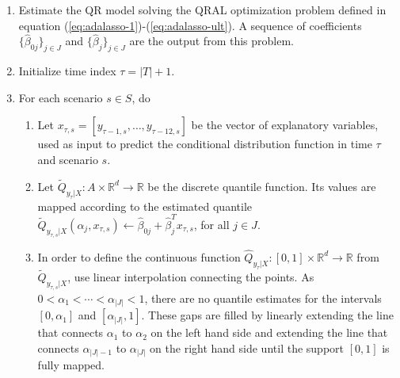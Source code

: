 \begin{enumerate}
	
	\item Estimate the QR model solving the QRAL optimization problem defined in equation (\ref{eq:adalasso-1})-(\ref{eq:adalasso-ult}). 
	A sequence of coefficients $\{ \hat\beta_{0j} \}_{j \in J}$ and $\{ \hat\beta_{j} \}_{j \in J}$ are the output from this problem. 

	\item Initialize time index $\tau = |T| + 1$.
	
	\item For each scenario $s \in S$, do
		\begin{enumerate}

		\item Let $x_{\tau,s} = [y_{\tau-1,s}, \dots, y_{\tau-12,s}]$ be the vector of explanatory variables, used as input to predict the conditional distribution function in time $\tau$ and scenario $s$.

		\item Let $\tilde{Q}_{y_\tau|X}:A \times \mathbb{R}^d \rightarrow \mathbb{R}$ be the discrete quantile function. Its values are mapped according to the estimated quantile $\tilde Q_{y_{\tau,s}|X}(\alpha_j, x_{\tau,s}) \leftarrow \hat\beta_{0j} + \hat\beta_j^T x_{\tau,s}$, for all $j \in J$.
		


		\item In order to define the continuous function $\hat{Q}_{y_\tau|X}:[0,1] \times \mathbb{R}^d \rightarrow \mathbb{R}$ from $\tilde Q_{y_{\tau,s}|X}$, use linear interpolation connecting the points. As $0 < \alpha_1 < \cdots < \alpha_{|J|} < 1$, there are no quantile estimates for the intervals $[0,\alpha_1]$ and $[\alpha_{|J|},1]$. These gaps are filled by linearly extending the line that connects $\alpha_1$ to $\alpha_2$ on the left hand side and extending the line that connects $\alpha_{|J|-1}$ to $\alpha_{|J|}$ on the right hand side until the support $[0,1]$ is fully mapped.  

		

\end{enumerate}
\end{enumerate}
